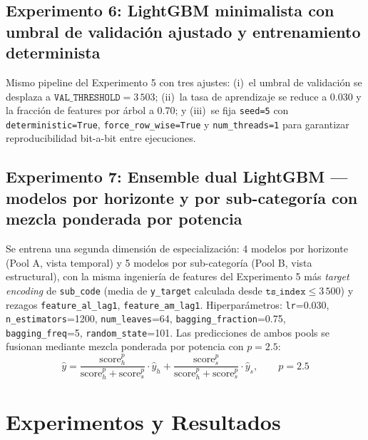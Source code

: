 \documentclass{article}
\begin{document}
\subsection{Experimento 6: LightGBM minimalista con umbral de validación ajustado y entrenamiento determinista}

Mismo pipeline del Experimento 5 con tres ajustes: (i)~el umbral de validación se desplaza a $\texttt{VAL\_THRESHOLD} = 3\,503$; (ii)~la tasa de aprendizaje se reduce a 0.030 y la fracción de features por árbol a 0.70; y (iii)~se fija \texttt{seed=5} con \texttt{deterministic=True}, \texttt{force\_row\_wise=True} y \texttt{num\_threads=1} para garantizar reproducibilidad bit-a-bit entre ejecuciones.

\subsection{Experimento 7: Ensemble dual LightGBM — modelos por horizonte y por sub-categoría con mezcla ponderada por potencia}

Se entrena una segunda dimensión de especialización: 4 modelos por horizonte (Pool A, vista temporal) y 5 modelos por sub-categoría (Pool B, vista estructural), con la misma ingeniería de features del Experimento 5 más \emph{target encoding} de \texttt{sub\_code} (media de \texttt{y\_target} calculada desde $\texttt{ts\_index} \leq 3\,500$) y rezagos \texttt{feature\_al\_lag1}, \texttt{feature\_am\_lag1}. Hiperparámetros: \texttt{lr}=0.030, \texttt{n\_estimators}=1200, \texttt{num\_leaves}=64, \texttt{bagging\_fraction}=0.75, \texttt{bagging\_freq}=5, \texttt{random\_state}=101. Las predicciones de ambos pools se fusionan mediante mezcla ponderada por potencia con $p=2.5$:
\begin{equation}
  \hat{y} = \frac{\mathrm{score}_h^{p}}{\mathrm{score}_h^{p} + \mathrm{score}_s^{p}} \cdot \hat{y}_h
          + \frac{\mathrm{score}_s^{p}}{\mathrm{score}_h^{p} + \mathrm{score}_s^{p}} \cdot \hat{y}_s, \qquad p = 2.5
  \label{eq:power_blend}
\end{equation}


\section{Experimentos y Resultados}
\end{document}
